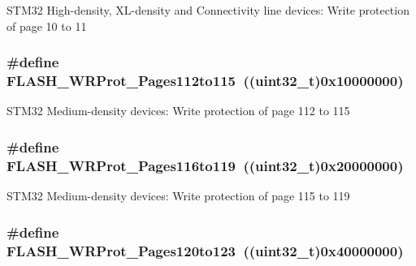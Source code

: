 \label{group__Option__Bytes__Write__Protection_ga778d8038df46c0d25d9a24717a5c5dc9}
STM32 High-\/density, XL-\/density and Connectivity line devices: Write protection of page 10 to 11 \hypertarget{group__Option__Bytes__Write__Protection_gacd2d5839240b77f70be15e76086745ab}{
\subsubsection[{FLASH\_\-WRProt\_\-Pages112to115}]{\setlength{\rightskip}{0pt plus 5cm}\#define FLASH\_\-WRProt\_\-Pages112to115~((uint32\_\-t)0x10000000)}}
\label{group__Option__Bytes__Write__Protection_gacd2d5839240b77f70be15e76086745ab}
STM32 Medium-\/density devices: Write protection of page 112 to 115 \hypertarget{group__Option__Bytes__Write__Protection_ga1283655c7c974e0de142cec7921c8673}{
\subsubsection[{FLASH\_\-WRProt\_\-Pages116to119}]{\setlength{\rightskip}{0pt plus 5cm}\#define FLASH\_\-WRProt\_\-Pages116to119~((uint32\_\-t)0x20000000)}}
\label{group__Option__Bytes__Write__Protection_ga1283655c7c974e0de142cec7921c8673}
STM32 Medium-\/density devices: Write protection of page 115 to 119 \hypertarget{group__Option__Bytes__Write__Protection_gac8d2f42123810fefc68572709d8830ec}{
\subsubsection[{FLASH\_\-WRProt\_\-Pages120to123}]{\setlength{\rightskip}{0pt plus 5cm}\#define FLASH\_\-WRProt\_\-Pages120to123~((uint32\_\-t)0x40000000)}}

